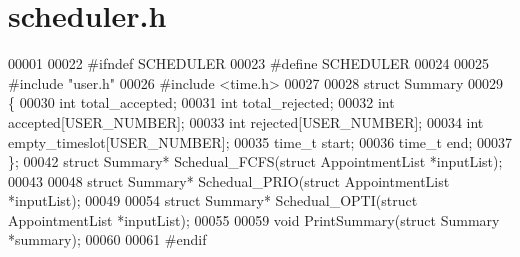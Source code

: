 \section{scheduler.\+h}
\label{scheduler_8h_source}

\begin{DoxyCode}
00001 
00022 \textcolor{preprocessor}{#ifndef SCHEDULER}
00023 \textcolor{preprocessor}{#define SCHEDULER}
00024 
00025 \textcolor{preprocessor}{#include "user.h"}
00026 \textcolor{preprocessor}{#include <time.h>}
00027 
00028 \textcolor{keyword}{struct }Summary
00029 \{
00030     \textcolor{keywordtype}{int} total\_accepted;
00031     \textcolor{keywordtype}{int} total\_rejected;
00032     \textcolor{keywordtype}{int} accepted[USER_NUMBER];
00033     \textcolor{keywordtype}{int} rejected[USER_NUMBER];
00034     \textcolor{keywordtype}{int} empty\_timeslot[USER_NUMBER];
00035     time\_t start;
00036     time\_t end;
00037 \};
00042 \textcolor{keyword}{struct }Summary* Schedual_FCFS(\textcolor{keyword}{struct} AppointmentList *inputList);
00043 
00048 \textcolor{keyword}{struct }Summary* Schedual_PRIO(\textcolor{keyword}{struct} AppointmentList *inputList);
00049 
00054 \textcolor{keyword}{struct }Summary* Schedual_OPTI(\textcolor{keyword}{struct} AppointmentList *inputList);
00055 
00059 \textcolor{keywordtype}{void} PrintSummary(\textcolor{keyword}{struct} Summary *summary);
00060 
00061 \textcolor{preprocessor}{#endif}
\end{DoxyCode}
